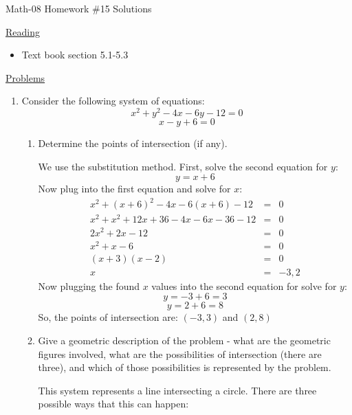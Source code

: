 \documentclass[letterpaper,12pt,fleqn]{article}
\begin{document}
\begin{center}
\Large Math-08 Homework \#15 Solutions
\end{center}

\vspace{0.5in}

\underline{Reading}

\begin{itemize}
\item Text book section 5.1-5.3
\end{itemize}

\underline{Problems}

\begin{enumerate}

\item Consider the following system of equations:
  \[x^2+y^2-4x-6y-12=0\]
  \[x-y+6=0\]
  \begin{enumerate}
  \item Determine the points of intersection (if any).

    We use the substitution method. First, solve the second equation for $y$:
    \[y=x+6\]
    Now plug into the first equation and solve for $x$:
    \begin{eqnarray*}
      x^2+(x+6)^2-4x-6(x+6)-12 &=& 0 \\
      x^2+x^2+12x+36-4x-6x-36-12 &=& 0 \\
      2x^2+2x-12 &=& 0 \\
      x^2+x-6 &=& 0 \\
      (x+3)(x-2) &=& 0 \\
      x &=& -3,2
    \end{eqnarray*}
    Now plugging the found $x$ values into the second equation for solve for
    $y$:
    \[y=-3+6=3\]
    \[y=2+6=8\]
    So, the points of intersection are: $(-3,3)$ and $(2,8)$

  \item Give a geometric description of the problem - what are the
    geometric figures involved, what are the possibilities of intersection
    (there are three), and which of those possibilities is represented by the
    problem.

    This system represents a line intersecting a circle. There are three
    possible ways that this can happen:

    \begin{minipage}{2in}


\end{minipage}
\end{enumerate}
\end{enumerate}
\end{document}
